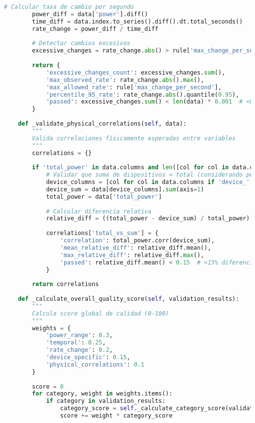 \begin{lstlisting}[language=Python, caption=Framework de validación de calidad de datos]
        # Calcular tasa de cambio por segundo
        power_diff = data['power'].diff()
        time_diff = data.index.to_series().diff().dt.total_seconds()
        rate_change = power_diff / time_diff
        
        # Detectar cambios excesivos
        excessive_changes = rate_change.abs() > rule['max_change_per_second']
        
        return {
            'excessive_changes_count': excessive_changes.sum(),
            'max_observed_rate': rate_change.abs().max(),
            'max_allowed_rate': rule['max_change_per_second'],
            'percentile_95_rate': rate_change.abs().quantile(0.95),
            'passed': excessive_changes.sum() < len(data) * 0.001  # <0.1% permitido
        }
    
    def _validate_physical_correlations(self, data):
        """
        Valida correlaciones físicamente esperadas entre variables
        """
        correlations = {}
        
        if 'total_power' in data.columns and len([col for col in data.columns if 'device_' in col]) > 1:
            # Validar que suma de dispositivos ≈ total (considerando pérdidas)
            device_columns = [col for col in data.columns if 'device_' in col]
            device_sum = data[device_columns].sum(axis=1)
            total_power = data['total_power']
            
            # Calcular diferencia relativa
            relative_diff = ((total_power - device_sum) / total_power).abs()
            
            correlations['total_vs_sum'] = {
                'correlation': total_power.corr(device_sum),
                'mean_relative_diff': relative_diff.mean(),
                'max_relative_diff': relative_diff.max(),
                'passed': relative_diff.mean() < 0.15  # <15% diferencia promedio
            }
        
        return correlations
    
    def _calculate_overall_quality_score(self, validation_results):
        """
        Calcula score global de calidad (0-100)
        """
        weights = {
            'power_range': 0.3,
            'temporal': 0.25,
            'rate_change': 0.2,
            'device_specific': 0.15,
            'physical_correlations': 0.1
        }
        
        score = 0
        for category, weight in weights.items():
            if category in validation_results:
                category_score = self._calculate_category_score(validation_results[category])
                score += weight * category_score
        

\end{lstlisting}
